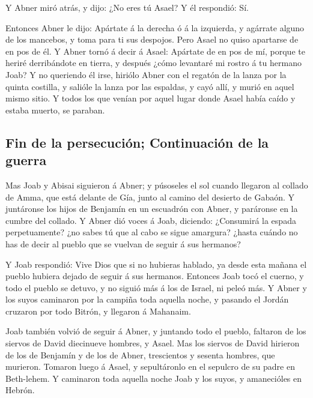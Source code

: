  Y Abner miró atrás, y dijo: ¿No eres tú Asael? Y él
respondió: Sí.

 Entonces Abner le dijo: Apártate á la derecha ó á la
izquierda, y agárrate alguno de los mancebos, y toma para ti sus
despojos. Pero Asael no quiso apartarse de en pos de él.  Y
Abner tornó á decir á Asael: Apártate de en pos de mí, porque te heriré
derribándote en tierra, y después ¿cómo levantaré mi rostro á tu hermano
Joab?  Y no queriendo él irse, hiriólo Abner con el regatón
de la lanza por la quinta costilla, y salióle la lanza por las espaldas,
y cayó allí, y murió en aquel mismo sitio. Y todos los que venían por
aquel lugar donde Asael había caído y estaba muerto, se paraban.

\hypertarget{fin-de-la-persecuciuxf3n-continuaciuxf3n-de-la-guerra}{%
\subsection{Fin de la persecución; Continuación de la
guerra}\label{fin-de-la-persecuciuxf3n-continuaciuxf3n-de-la-guerra}}

 Mas Joab y Abisai siguieron á Abner; y púsoseles el sol
cuando llegaron al collado de Amma, que está delante de Gía, junto al
camino del desierto de Gabaón.  Y juntáronse los hijos de
Benjamín en un escuadrón con Abner, y paráronse en la cumbre del
collado.  Y Abner dió voces á Joab, diciendo: ¿Consumirá la
espada perpetuamente? ¿no sabes tú que al cabo se sigue amargura? ¿hasta
cuándo no has de decir al pueblo que se vuelvan de seguir á sus
hermanos?

 Y Joab respondió: Vive Dios que si no hubieras hablado, ya
desde esta mañana el pueblo hubiera dejado de seguir á sus hermanos.
 Entonces Joab tocó el cuerno, y todo el pueblo se detuvo,
y no siguió más á los de Israel, ni peleó más.  Y Abner y
los suyos caminaron por la campiña toda aquella noche, y pasando el
Jordán cruzaron por todo Bitrón, y llegaron á Mahanaim.

 Joab también volvió de seguir á Abner, y juntando todo el
pueblo, faltaron de los siervos de David diecinueve hombres, y Asael.
 Mas los siervos de David hirieron de los de Benjamín y de
los de Abner, trescientos y sesenta hombres, que murieron. Tomaron luego
á Asael, y sepultáronlo en el sepulcro de su padre en Beth-lehem.
 Y caminaron toda aquella noche Joab y los suyos, y
amanecióles en Hebrón.

